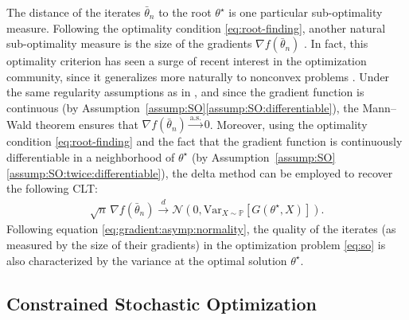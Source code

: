 \documentclass[11pt,a4paper]{article}
\theoremstyle{definition}
\begin{document}
The distance of the iterates $\bar \theta_n$ to the root $\theta^\star$ is one particular sub-optimality measure. Following the optimality condition \eqref{eq:root-finding}, another natural sub-optimality measure is the size of the gradients $\nabla {f}(\bar{\theta}_n)$ \citep{nesterov2012make}.
In fact, this optimality criterion has seen a surge of recent interest in the optimization community, since it generalizes more naturally to nonconvex problems \cite{foster2019complexity}. 
Under the same regularity assumptions as in \citet[Theorem~2]{polyak1992acceleration}, and since the gradient function is continuous (by Assumption~\ref{assump:SO}\ref{assump:SO:differentiable}), the Mann–Wald theorem ensures that $\nabla {f}(\bar{\theta}_n) \overset{\text{a.s.}}{\to} 0$. Moreover, using the optimality condition \eqref{eq:root-finding} and the fact that the gradient function is continuously differentiable in a neighborhood of $\theta^\star$ (by Assumption~\ref{assump:SO}\ref{assump:SO:twice:differentiable}), the delta method can be employed to recover the following CLT:
\begin{align}
\label{eq:gradient:asymp:normality}
    \sqrt{n}\, \nabla f(\bar{\theta}_n) \overset{d}{\to} \mathcal N \left(0, \text{Var}_{X \sim \mathbb P}\left[G(\theta^\star,X)\right]\right).
\end{align}
Following equation \eqref{eq:gradient:asymp:normality}, the quality of the iterates (as measured by the size of their gradients) in the optimization problem \eqref{eq:so} is also characterized by the variance at the optimal solution $\theta^\star$.







\subsection{Constrained Stochastic Optimization}
\label{subsec:constrained:stoch:approx}
\end{document}
